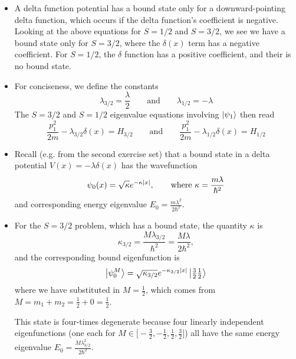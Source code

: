 \documentclass[11pt, a4paper]{article}
\newcommand{\eqtext}[1]{\qquad \text{#1} \qquad}
\begin{document}
\begin{itemize}
	\item A delta function potential has a bound state only for a downward-pointing delta function, which occurs if the delta function's coefficient is negative. Looking at the above equations for $ S = 1/2$ and $ S = 3/2 $, we see we have a bound state only for $ S = 3/2 $, where the $ \delta(x) $ term has a negative coefficient. For $ S = 1/2 $, the $ \delta $ function has a positive coefficient, and their is no bound state.
	
	\item For conciseness, we define the constants 
	\begin{equation*}
		\lambda_{3/2} = \frac{\lambda}{2} \eqtext{and} \lambda_{1/2} = - \lambda
	\end{equation*}
	The $ S = 3/2 $ and $ S = 1/2 $ eigenvalue equations involving $ \ket{\psi_{1}} $ then read
		\begin{equation*}
			\frac{p_{1}^{2}}{2m} - \lambda_{3/2}\delta(x) = H_{3/2} \eqtext{and} \frac{p_{1}^{2}}{2m} - \lambda_{1/2}\delta(x) = H_{1/2} 
		\end{equation*}
		
	\item Recall (e.g. from the second exercise set) that a bound state in a delta potential $ V(x) = - \lambda \delta(x) $ has the wavefunction
	\begin{equation*}
		 \psi_{0}(x) = \sqrt{\kappa} e^{-\kappa \abs{x}}, \qquad \text{where } \kappa = \frac{m\lambda}{\hbar^{2}}
	\end{equation*}
	and corresponding energy eigenvalue $  E_{0} = \frac{m\lambda^{2}}{2\hbar^{2}} $.
	
	
	\item For the $ S = 3/2 $ problem, which has a bound state, the quantity $ \kappa $ is
	\begin{equation*}
		\kappa_{3/2} = \frac{M\lambda_{3/2}}{\hbar^{2}} = \frac{M\lambda}{2\hbar^{2}},
	\end{equation*}
	and the corresponding bound eigenfunction is
	\begin{equation*}
		\ket{\psi_{0}^{M}} = \sqrt{\kappa_{3/2}}e^{-\kappa_{3/2}\abs{x}} \ket{\tfrac{3}{2}\tfrac{1}{2}}
	\end{equation*}
	where we have substituted in $ M = \frac{1}{2} $, which comes from $ M = m_{1} + m_{2} = \frac{1}{2} + 0 = \frac{1}{2} $.
	
	This state is four-times degenerate because four linearly independent eigenfunctions (one each for $ M \in \big[-\frac{3}{2}, -\frac{1}{2}, \frac{1}{2}, \frac{3}{2}\big] $) all have the same energy eigenvalue $ E_{0} = \frac{M\lambda_{3/2}^{2}}{2\hbar^{2}} $. 
	

\end{itemize}
\end{document}
